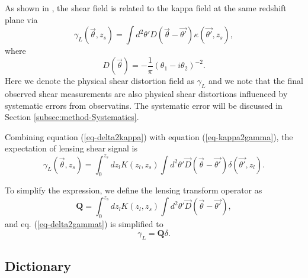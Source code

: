 \documentclass[twocolumn]{aastex62}
\begin{document}
As shown in \citet{massMap-KS1993}, the shear field is related to the kappa field at the same redshift plane
via
\begin{equation}\label{eq-kappa2gamma}
\gamma_L(\vec{\theta},z_s) = \int  d^2 \theta' D(\vec{\theta}-\vec{\theta'}) \kappa(\vec{\theta'},z_s),
\end{equation}
where
\begin{equation}
D(\vec{\theta})=-\frac{1}{\pi}(\theta_1-i\theta_2)^{-2}.
\end{equation}
Here we denote the physical shear distortion field as $\gamma_L$ and we note that the final observed shear measurements 
are also physical shear distortions influenced by systematic errors from observatins. The systematic error will be discussed 
in Section \ref{subsec:method-Systematics}.

Combining equation (\ref{eq-delta2kappa}) with equation (\ref{eq-kappa2gamma}), the expectation of lensing shear signal is 
\begin{equation}\label{eq-delta2gammat}
\gamma_L(\vec{\theta},z_s) = \int_0^{z_s} dz_l K(z_l,z_s) \int d^2 \theta' \vec{D}(\vec{\theta}-\vec{\theta'}) \delta(\vec{\theta'},z_l).
\end{equation}

To simplify the expression, we define the lensing transform operator as
\begin{equation}
\mathbf{Q}=\int_0^{z_s} dz_l K(z_l,z_s) \int d^2 \theta'  \vec{D}(\vec{\theta}-\vec{\theta'}),
\end{equation}
and eq. (\ref{eq-delta2gammat}) is simplified to
\begin{equation} \label{eq-delta2gammat-simp}
\gamma_L=\mathbf{Q}\delta.
\end{equation}

\subsection{Dictionary}
\label{subsec:method-dictionary}
\end{document}
